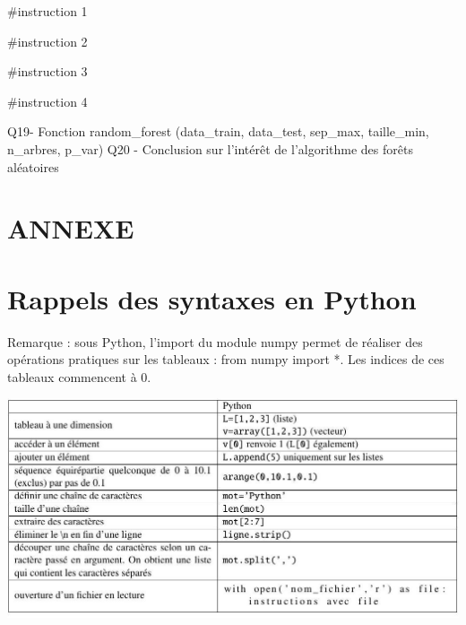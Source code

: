 \documentclass[10pt]{article}
\begin{document}
\#instruction 1

\#instruction 2

\#instruction 3

\#instruction 4

Q19- Fonction random\_forest (data\_train, data\_test, sep\_max, taille\_min, n\_arbres, p\_var) Q20 - Conclusion sur l'intérêt de l'algorithme des forêts aléatoires

\section{ANNEXE}
\section{Rappels des syntaxes en Python}
Remarque : sous Python, l'import du module numpy permet de réaliser des opérations pratiques sur les tableaux : from numpy import *. Les indices de ces tableaux commencent à $0 .$

\includegraphics[max width=\textwidth]{2022_02_02_1af495ea60fb42b668bfg-20}
\end{document}
